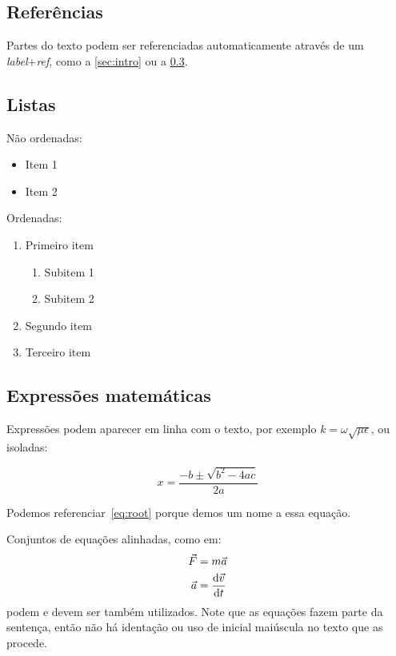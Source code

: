 \documentclass[brazilian, a4paper, 11pt]{article}
\begin{document}
\subsection{Referências}

Partes do texto podem ser referenciadas automaticamente através de um \emph{label}+\emph{ref}, como a \cref{sec:intro} ou a \cref{ssec:math}.


\subsection{Listas}

Não ordenadas:

\begin{itemize}
	\item Item 1
	\item Item 2
\end{itemize}

Ordenadas:

\begin{enumerate}
	\item Primeiro item
	\begin{enumerate}
		\item Subitem 1
		\item Subitem 2
	\end{enumerate}
	\item Segundo item
	\item Terceiro item
\end{enumerate}


\subsection{Expressões matemáticas}
\label{ssec:math}

Expressões podem aparecer em linha com o texto, por exemplo $k = \omega \sqrt{\mu \epsilon}$, ou isoladas:

\begin{equation}
\label{eq:root}
x = \frac{-b \pm \sqrt{b^2 - 4ac}}{2a}
\end{equation}

Podemos referenciar~\eqref{eq:root} porque demos um nome a essa equação.

Conjuntos de equações alinhadas, como em:
%
\begin{align}
\vec{F} &= m \vec{a} \\
\vec{a} &= \frac{{\rm d}\vec{v}}{{\rm d}t}
\end{align}
%
podem e devem ser também utilizados.
Note que as equações fazem parte da sentença, então não há identação ou uso de inicial maiúscula no texto que as procede.
\end{document}

